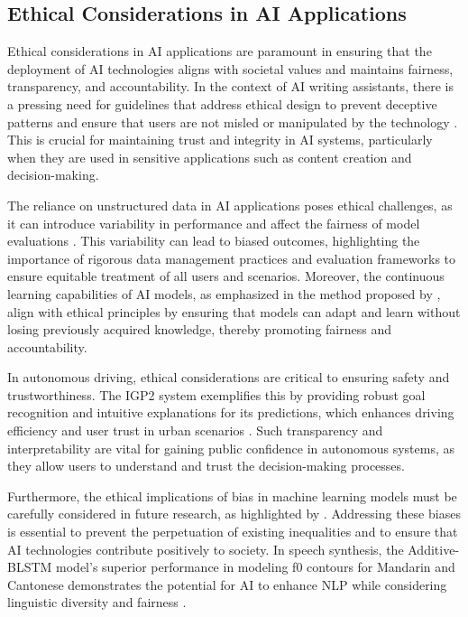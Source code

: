 \subsection{Ethical Considerations in AI Applications} \label{subsec:Ethical Considerations in AI Applications}

Ethical considerations in AI applications are paramount in ensuring that the deployment of AI technologies aligns with societal values and maintains fairness, transparency, and accountability. In the context of AI writing assistants, there is a pressing need for guidelines that address ethical design to prevent deceptive patterns and ensure that users are not misled or manipulated by the technology \cite{benharrak2024deceptivepatternsintelligentinteractive}. This is crucial for maintaining trust and integrity in AI systems, particularly when they are used in sensitive applications such as content creation and decision-making.



The reliance on unstructured data in AI applications poses ethical challenges, as it can introduce variability in performance and affect the fairness of model evaluations \cite{zhou2024languageconditionedimitationlearningbase}. This variability can lead to biased outcomes, highlighting the importance of rigorous data management practices and evaluation frameworks to ensure equitable treatment of all users and scenarios. Moreover, the continuous learning capabilities of AI models, as emphasized in the method proposed by \cite{chitale2023taskarithmeticloracontinual}, align with ethical principles by ensuring that models can adapt and learn without losing previously acquired knowledge, thereby promoting fairness and accountability.



In autonomous driving, ethical considerations are critical to ensuring safety and trustworthiness. The IGP2 system exemplifies this by providing robust goal recognition and intuitive explanations for its predictions, which enhances driving efficiency and user trust in urban scenarios \cite{albrecht2021interpretablegoalbasedpredictionplanning}. Such transparency and interpretability are vital for gaining public confidence in autonomous systems, as they allow users to understand and trust the decision-making processes.



Furthermore, the ethical implications of bias in machine learning models must be carefully considered in future research, as highlighted by \cite{shanks2004speculationgraphcomputationarchitectures}. Addressing these biases is essential to prevent the perpetuation of existing inequalities and to ensure that AI technologies contribute positively to society. In speech synthesis, the Additive-BLSTM model's superior performance in modeling f0 contours for Mandarin and Cantonese demonstrates the potential for AI to enhance NLP while considering linguistic diversity and fairness \cite{yuan2018generatingmandarincantonesef0}.



